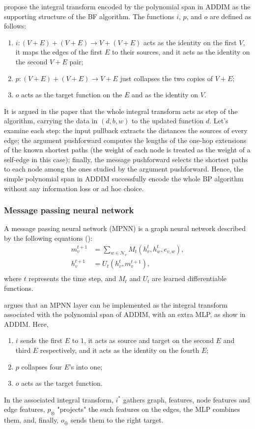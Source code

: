\documentclass[11pt,a4paper,openright,twoside]{report}
\theoremstyle{plain}
\theoremstyle{definition}
\begin{document}
\cite{dudzik2022graph} propose the integral transform encoded by the polynomial span in ADDIM as the supporting structure of the BF algorithm. The functions $i$, $p$, and $o$ are defined as follows:
\begin{enumerate}
  \item $i: (V + E) + (V + E) \to V + (V + E)$ acts as the identity on the first $V$, it maps the edges of the first $E$ to their sources, and it acts as the identity on the second $V + E$ pair;
  \item $p: (V + E) + (V + E) \to V + E$ just collapses the two copies of $V + E$;
  \item $o$ acts as the target function on the $E$ and as the identity on $V$.
\end{enumerate}
It is argued in the paper that the whole integral transform acts as step of the algorithm, carrying the data in $(d, b, w)$ to the updated function $d$. Let's examine each step: the input pullback extracts the distances the sources of every edge; the argument pushforward computes the lengths of the one-hop extensions of the known shortest paths (the weight of each node is treated as the weight of a self-edge in this case); finally, the message pushforward selects the shortest paths to each node among the ones studied by the argument pushforward. 
Hence, the simple polynomial span in ADDIM successfully encode the whole BP algorithm without any information loss or ad hoc choice. 

\subsubsection{Message passing neural network}

A message passing neural network (MPNN) is a graph neural network described by the following equations (\cite{pmlr-v70-gilmer17a}):
\begin{align*}
  m_v^{t+1} &= \sum_{w \in \mathcal{N}_v}M_t(h_v^t,h_w^t,e_{v,w}),\\
  h_v^{t+1} &= U_t(h_v^t,m_v^{t+1}),\\
\end{align*}
where $t$ represents the time step, and $M_t$ and $U_t$ are learned differentiable functions.


\cite{dudzik2022graph} argues that an MPNN layer can be implemented as the integral transform associated with the polynomial span of ADDIM, with an extra MLP, as show in ADDIM. Here,
\begin{enumerate}
  \item $i$ sends the first $E$ to $1$, it acts as source and target on the second $E$ and third $E$ respectively, and it acts as the identity on the fourth $E$;
  \item $p$ collapses four $E$'s into one;
  \item $o$ acts as the target function.
\end{enumerate}
In the associated integral transform, $i^*$ gathers graph, features, node features and edge features, $p_{\otimes}$ "projects" the such features on the edges, the MLP combines them, and, finally, $o_{\oplus}$ sends them to the right target.
\end{document}
